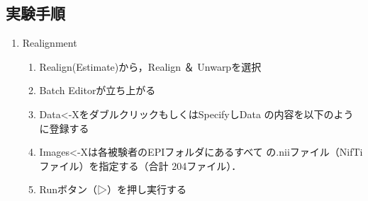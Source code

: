 \documentclass{jlreq}
\begin{document}
\subsection{実験手順}
\begin{enumerate}
    \item Realignment
    \begin{enumerate}
        \item Realign(Estimate)から，Realign ＆ Unwarpを選択
        \item Batch Editorが立ち上がる
        \item Data<-XをダブルクリックもしくはSpecifyしData
の内容を以下のように登録する 
        \item Images<-Xは各被験者のEPIフォルダにあるすべて
の.niiファイル（NifTiファイル）を指定する（合計
204ファイル）．
        \item Runボタン（▷）を押し実行する 
    \end{enumerate}


\end{enumerate}
\end{document}
